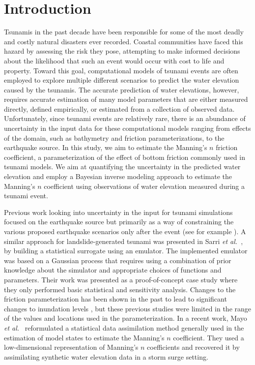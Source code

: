 
\section{Introduction} \label{sec:intro}

Tsunamis in the past decade have been responsible for some of the most  deadly
and costly natural disasters ever recorded. Coastal communities  have faced this
hazard by assessing the risk they pose, attempting  to make informed decisions
about the likelihood that such an event would  occur with cost to life and
property.  Toward this goal, computational models of  tsunami events are often
employed to explore multiple different scenarios to predict the water elevation
caused by the tsunamis. The accurate prediction  of water elevations, however,
requires accurate estimation of many model parameters that are either measured
directly, defined empirically, or estimated from a collection of observed data.
Unfortunately, since tsunami events are relatively rare,  there is an abundance
of uncertainty in the input data for these computational  models ranging from
effects of the domain, such as bathymetry and friction parameterizations,  to
the earthquake source.  In this study, we aim to estimate the Manning's $n$
friction coefficient, a parameterization of the effect of bottom friction 
commonly used in tsunami models.  We aim at quantifying the uncertainty in the 
predicted water elevation  and employ
a Bayesian inverse modeling approach to estimate the Manning's $n$ coefficient
using observations of water elevation measured during a tsunami event.

Previous work looking into uncertainty in the input for tsunami simulations
focused on the earthquake source but primarily as a way of
constraining the various proposed earthquake scenarios only after the event (see
for example \cite{MacInnes:2013cr}).  A similar approach for landslide-generated
tsunami was presented in Sarri \emph{et al.}~\cite{Sarri2012}, by building a statistical surrogate
using an emulator. The implemented emulator was based on a Gaussian
process that requires using a combination of prior knowledge about the simulator
and appropriate choices of functions and parameters. Their work was presented as
a proof-of-concept case study where they only performed basic statistical and
sensitivity analysis.  Changes to the friction parameterization has been shown in 
the past to lead to significant changes to inundation levels \cite{Myers:2001el, 
Jakeman:2010hk}, but these previous studies were limited in the range of the 
values and locations used in the parameterization.  
In a recent work, Mayo \emph{et al.}~\cite{Mayo:2014} reformulated a statistical data assimilation method
generally used in the estimation of model states to estimate the Manning's $n$
coefficient. They used a low-dimensional representation of
Manning's $n$ coefficients and recovered it by assimilating synthetic water elevation data
in a storm surge setting.

